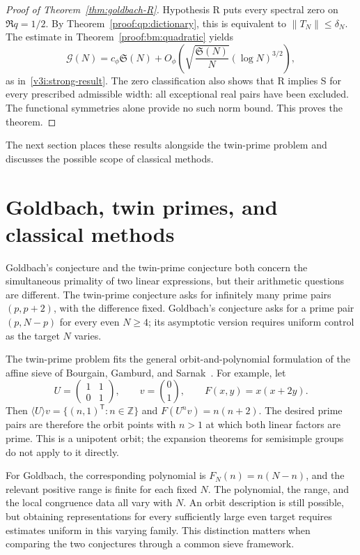 \documentclass[12pt,a4paper]{amsart}
\numberwithin{equation}{section}
\def\le{\leqslant}
\def\ge{\geqslant}
\theoremstyle{plain}
\theoremstyle{definition}
\theoremstyle{remark}
\begin{document}
\begin{proof}[Proof of Theorem~\ref{thm:goldbach-R}]
Hypothesis R puts every spectral zero on $\Re q=1/2$.
By Theorem~\ref{proof:qp:dictionary}, this is equivalent to
$\|T_N\|\le\delta_N$. The estimate in
Theorem~\ref{proof:bm:quadratic} yields
\[
 \mathcal G(N)=c_\phi\mathfrak S(N)
 +O_\phi\!\left(\sqrt{\frac{\mathfrak S(N)}N}(\log N)^{3/2}\right),
\]
as in~\eqref{v3i:strong-result}.
The zero classification also shows that R implies S for every
prescribed admissible width: all exceptional real pairs have been
excluded. The functional symmetries alone provide no such norm bound.
This proves the theorem.
\end{proof}

The next section places these results alongside the twin-prime
problem and discusses the possible scope of classical methods.

\section{Goldbach, twin primes, and classical methods}
\label{story:philosophy}\label{proof:v7:philosophy}

Goldbach's conjecture and the twin-prime conjecture both concern
the simultaneous primality of two linear expressions, but their
arithmetic questions are different. The twin-prime conjecture asks
for infinitely many prime pairs $(p,p+2)$, with the difference fixed.
Goldbach's conjecture asks for a prime pair $(p,N-p)$ for every even
$N\ge4$; its asymptotic version requires uniform control as the
target $N$ varies.

The twin-prime problem fits the general orbit-and-polynomial
formulation of the affine sieve of Bourgain, Gamburd, and
Sarnak~\cite{BGS2010}. For example, let
\[
 U=\begin{pmatrix}1&1\\0&1\end{pmatrix},\qquad
 v=\binom01,\qquad F(x,y)=x(x+2y).
\]
Then $\langle U\rangle v=\{(n,1)^{\mathsf T}:n\in\mathbb Z\}$ and
$F(U^nv)=n(n+2)$. The desired prime pairs are therefore the orbit
points with $n>1$ at which both linear factors are prime.
This is a unipotent orbit; the expansion theorems for semisimple
groups do not apply to it directly.

For Goldbach, the corresponding polynomial is $F_N(n)=n(N-n)$,
and the relevant positive range is finite for each fixed $N$.
The polynomial, the range, and the local congruence data all vary
with $N$. An orbit description is still possible, but obtaining
representations for every sufficiently large even target requires
estimates uniform in this varying family. This distinction matters
when comparing the two conjectures through a common sieve framework.
\end{document}
